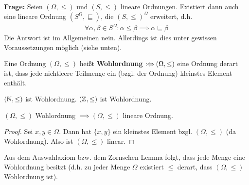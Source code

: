 \textbf{Frage:} Seien $(\Omega,\leq)$ und $(S,\leq)$ lineare Ordnungen. 
Existiert dann auch eine lineare Ordnung $(S^\Omega,\sqsubseteq)$, die $(S,\leq)^\Omega$ erweitert, d.h.
\begin{align*}
	\forall\alpha,\beta\in S^\Omega:\alpha\leq\beta\implies\alpha\sqsubseteq\beta
\end{align*}
Die Antwort ist im Allgemeinen nein. Allerdings ist dies unter gewissen Voraussetzungen möglich (siehe unten).

\begin{definition}
	Eine Ordnung $(\Omega,\leq)$ heißt \textbf{Wohlordnung} 
	$:\Leftrightarrow(\Omega,\leq)$ eine Ordnung derart ist, dass jede nichtleere Teilmenge ein (bzgl. der Ordnung) kleinstes Element enthält.
\end{definition}

\begin{beispiel}
	$(\mathbb{N},\leq)$ ist Wohlordnung.
	$(\mathbb{Z},\leq)$ ist  Wohlordnung.
\end{beispiel}

\begin{bemerkung}
	$(\Omega,\leq)$ Wohlordnung $\implies(\Omega,\leq)$ lineare Ordnung.
\end{bemerkung}

\begin{proof}
	Sei $x,y\in\Omega$. 
	Dann hat $\lbrace x,y\rbrace$ ein kleinstes Element bzgl. $(\Omega,\leq)$ (da Wohlordnung). 
	Also ist $(\Omega,\leq)$ linear.
\end{proof}

\begin{satz}[Wohlordnungssatz]
 Aus dem Auswahlaxiom bzw. dem Zornschen Lemma folgt, dass jede Menge eine Wohlordnung besitzt 
(d.h. zu jeder Menge $\Omega$ existiert $\leq$ derart, dass $(\Omega,\leq)$ Wohlordnung ist).
\end{satz}


